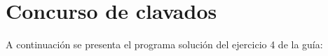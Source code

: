 \section{Concurso de clavados}

  A continuación se presenta el programa solución
  del ejercicio 4 de la guía:
  
  